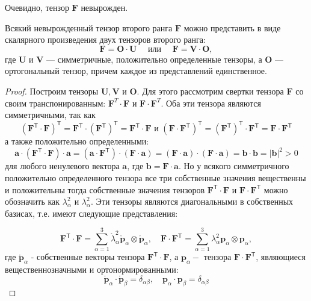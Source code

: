 Очевидно, тензор $ \mathbf{F} $ невырожден.

\begin{theorem*}
Всякий невырожденный тензор второго ранга
$\mathbf{F}$ можно представить в виде скалярного произведения двух тензоров
второго ранга: \[
\mathbf{F}=\mathbf{O} \cdot \mathbf{U} \quad \text { или } \quad
\mathbf{F}=\mathbf{V} \cdot \mathbf{O}, 
\]
где $ \mathbf{U} $ и $ \mathbf{V} $ --- симметричные, положительно определенные
тензоры, а $ \mathbf{O} $ --- ортогональный тензор, причем каждое из
представлений единственное.
\end{theorem*}
\begin{proof}
Построим тензоры $\mathbf{U}, \mathbf{V}$ и $ \mathbf{O} $. Для этого рассмотрим свертки
тензора $\mathbf{F}$ со своим транспонированным: $\mathbf{F}^{{T}} \cdot
\mathbf{F}$ и $\mathbf{F} \cdot \mathbf{F}^{{T}}$. Оба эти тензора
являются симметричными, так как
\[
\left(\mathbf{F}^{\mathsf{T}} \cdot
\mathbf{F}\right)^{\mathsf{T}}=\mathbf{F}^{\mathsf{T}}
\cdot\left(\mathbf{F}^{\mathsf{T}}\right)^{\mathsf{T}}=\mathbf{F}^{\mathsf{T}}
\cdot \mathbf{F} \text { и }\left(\mathbf{F} \cdot
\mathbf{F}^{\mathsf{T}}\right)^{\mathsf{T}}=\left(\mathbf{F}^{\mathsf{T}}\right)^{\mathsf{T}}
\cdot \mathbf{F}^{\mathsf{T}}=\mathbf{F} \cdot \mathbf{F}^{\mathsf{T}} \]
а также положительно определенными:
\[
\mathbf{a} \cdot\left(\mathbf{F}^{\mathsf{T}} \cdot \mathbf{F}\right) \cdot
\mathbf{a}=\left(\mathbf{a} \cdot \mathbf{F}^{\mathsf{T}}\right)
\cdot(\mathbf{F} \cdot \mathbf{a})=(\mathbf{F} \cdot \mathbf{a})
\cdot(\mathbf{F} \cdot \mathbf{a})=\mathbf{b} \cdot
\mathbf{b}=|\mathbf{b}|^{2}>0 \]
для любого ненулевого вектора $\mathbf{a}$, где $\mathbf{b}=\mathbf{F} \cdot
\mathbf{a}$. Но у всякого симметричного положительно определенного тензора все
три собственные значения вещественны и положительны тогда собственные значения
тензоров $\mathbf{F}^{\mathsf{T}} \cdot \mathbf{F}$ и $\mathbf{F} \cdot
\mathbf{F}^{\mathsf{T}}$ можно обозначить как $\lambda_{\alpha}^{2}$ и
$\lambda_{\alpha}^{2}$. Эти тензоры являются диагональными в собственных
базисах, т.е. имеют следующие представления:

\[
  \mathbf{F}^{\mathsf{T}} \cdot \mathbf{F}=\sum_{\alpha=1}^{3}
  \mathring{\lambda}_\alpha^2
\mathring{\mathbf{p}}_{\alpha} \otimes \mathring{\mathbf{p}}_{\alpha}, \quad
\mathbf{F} \cdot \mathbf{F}^{\mathsf{T}}=\sum_{\alpha=1}^{3}
\lambda_{\alpha}^{2} \mathbf{p}_{\alpha} \otimes \mathbf{p}_{\alpha},
\] 
где $\mathring{\mathbf{p}}_{\alpha}$ - собственные векторы тензора
$\mathbf{F}^{\mathsf{T}} \cdot \mathbf{F}$, а $\mathbf{p}_{\alpha}-$ тензора
$\mathbf{F} \cdot \mathbf{F}^{\mathsf{T}}$, являющиеся вещественнозначными и
ортонормированными:
\[
\mathring{\mathbf{p}}_{\alpha} \cdot \mathring{\mathbf{p}}_{\beta}=\delta_{\alpha \beta}, \quad \mathbf{p}_{\alpha} \cdot \mathbf{p}_{\beta}=\delta_{\alpha \beta}
\]


\end{proof}
